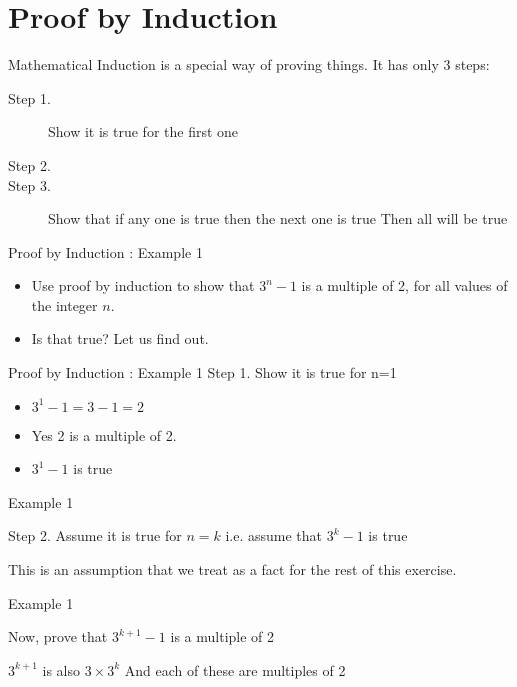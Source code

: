 \documentclass[12pt]{article}
\begin{document}
\section{Proof by Induction}

Mathematical Induction is a special way of proving things. It has only 3 steps:

\begin{description}
\item[Step 1.] Show it is true for the first one
\item[Step 2.]
\item[Step 3.] Show that if any one is true then the next one is true
Then all will be true
\end{description}



{Proof by Induction : Example 1}

\begin{itemize}
\item Use proof by induction to show that $3^n-1$ is a multiple of 2, for all values of the integer $n$.
\item Is that true? Let us find out.
\end{itemize} 


{Proof by Induction : Example 1}
Step 1. Show it is true for n=1

\begin{itemize}
\item $3^1-1 = 3-1 = 2$
\item Yes 2 is a multiple of 2. 
\item $3^1-1$ is true
\end{itemize}



{Example 1}

Step 2. Assume it is true for $n=k$ i.e. assume that $3^k-1$ is true

This is an assumption that we treat 
as a fact for the rest of this exercise.




{Example 1}

Now, prove that $3^{k+1}-1$ is a multiple of 2
 
 
$3^{k+1}$ is also $3\times3^{k}$
And each of these are multiples of 2
\end{document}
